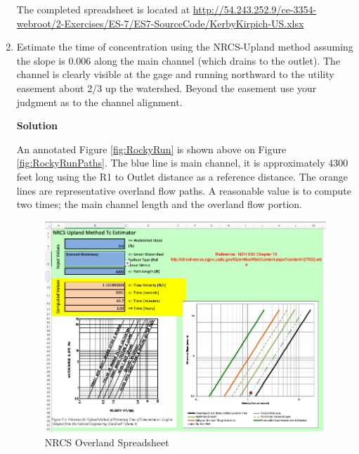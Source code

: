 \documentclass[12pt]{article}
\begin{document}
\begin{enumerate}
The completed spreadsheet is located at \url{http://54.243.252.9/ce-3354-webroot/2-Exercises/ES-7/ES7-SourceCode/KerbyKirpich-US.xlsx}
\clearpage

\item Estimate the time of concentration using the NRCS-Upland method assuming the slope is 0.006 along the main channel (which drains to the outlet).  The channel is clearly visible at the gage and running northward to the utility easement about 2/3 up the watershed.  Beyond the easement use your judgment as to the channel alignment. 

\textbf{Solution}

An annotated Figure \ref{fig:RockyRun} is shown above on Figure \ref{fig:RockyRunPaths}.  The blue line is main channel, it is approximately 4300 feet long using the R1 to Outlet distance as a reference distance.  The orange lines are representative overland flow paths. A reasonable value is to compute two times; the main channel length and the overland flow portion.

\begin{figure}[h!] %
   \centering
   \includegraphics[width=5.0in]{NRCS-OV1.png} 
   \caption{NRCS Overland Spreadsheet}
   \label{fig:NRCS-OV1}
\end{figure}


\end{enumerate}
\end{document}
